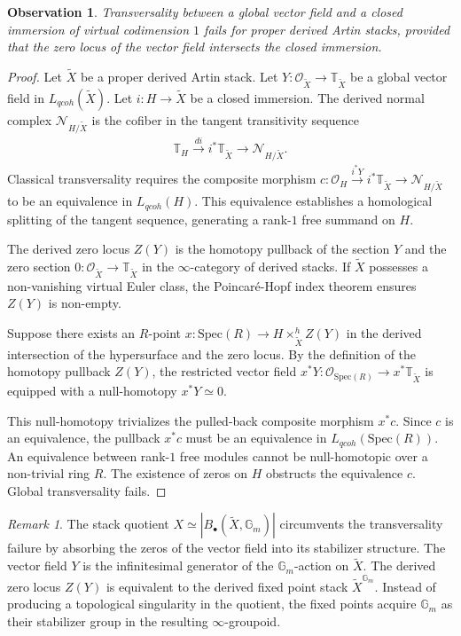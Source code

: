 \documentclass[reqno]{amsart}
\newtheorem{observation}[theorem]{Observation}
\theoremstyle{definition}
\theoremstyle{remark}
\newtheorem{remark}[theorem]{Remark}
\newcommand{\TT}{\mathbb{T}}
\newcommand{\cO}{\mathcal{O}}
\begin{document}
{\begin{observation}
  \label{prop:transversality_failure}
  Transversality between a global vector field and a closed immersion of virtual codimension $1$ fails for proper derived Artin stacks, provided that the zero locus of the vector field intersects the closed immersion.
\end{observation}
\begin{proof}
  Let $\widetilde{X}$ be a proper derived Artin stack. Let $Y \colon \cO_{\widetilde{X}} \to \TT_{\widetilde{X}}$ be a global vector field in $L_{qcoh}(\widetilde{X})$. Let $i \colon H \to \widetilde{X}$ be a closed immersion. The derived normal complex $\mathcal{N}_{H/\widetilde{X}}$ is the cofiber in the tangent transitivity sequence
  \begin{align*}
    \TT_H \xrightarrow{di} i^*\TT_{\widetilde{X}} \to \mathcal{N}_{H/\widetilde{X}}.
  \end{align*}
  Classical transversality requires the composite morphism $c \colon \cO_H \xrightarrow{i^*Y} i^*\TT_{\widetilde{X}} \to \mathcal{N}_{H/\widetilde{X}}$ to be an equivalence in $L_{qcoh}(H)$. This equivalence establishes a homological splitting of the tangent sequence, generating a rank-$1$ free summand on $H$.

  The derived zero locus $Z(Y)$ is the homotopy pullback of the section $Y$ and the zero section $0 \colon \cO_{\widetilde{X}} \to \TT_{\widetilde{X}}$ in the $\infty$-category of derived stacks. If $\widetilde{X}$ possesses a non-vanishing virtual Euler class, the Poincar\'{e}-Hopf index theorem ensures $Z(Y)$ is non-empty.

  Suppose there exists an $R$-point $x \colon \mathrm{Spec}(R) \to H \times_{\widetilde{X}}^h Z(Y)$ in the derived intersection of the hypersurface and the zero locus. By the definition of the homotopy pullback $Z(Y)$, the restricted vector field $x^*Y \colon \cO_{\mathrm{Spec}(R)} \to x^*\TT_{\widetilde{X}}$ is equipped with a null-homotopy $x^*Y \simeq 0$.

  This null-homotopy trivializes the pulled-back composite morphism $x^*c$. Since $c$ is an equivalence, the pullback $x^*c$ must be an equivalence in $L_{qcoh}(\mathrm{Spec}(R))$. An equivalence between rank-$1$ free modules cannot be null-homotopic over a non-trivial ring $R$. The existence of zeros on $H$ obstructs the equivalence $c$. Global transversality fails.  
\end{proof}

\begin{remark}
  \label{rmk:slice_vs_quotient}
  The stack quotient $X \simeq |B_\bullet(\widetilde{X}, \mathbb{G}_m)|$ circumvents the transversality failure by absorbing the zeros of the vector field into its stabilizer structure. The vector field $Y$ is the infinitesimal generator of the $\mathbb{G}_m$-action on $\widetilde{X}$. The derived zero locus $Z(Y)$ is equivalent to the derived fixed point stack $\widetilde{X}^{\mathbb{G}_m}$. Instead of producing a topological singularity in the quotient, the fixed points acquire $\mathbb{G}_m$ as their stabilizer group in the resulting $\infty$-groupoid.


\end{remark}}
\end{document}
